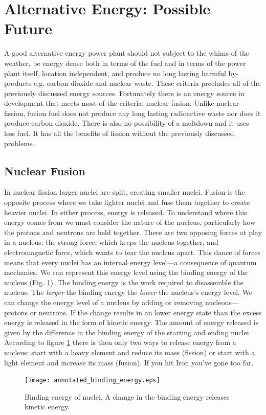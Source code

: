 \section{Alternative Energy: Possible Future}
A good alternative energy power plant should not subject to the whims of the weather, be energy dense both in terms of the fuel and in terms of the power plant itself, location independent, and produce no long lasting harmful by-products e.g. carbon dioxide and nuclear waste. These criteria precludes all of the previously discussed energy sources. Fortunately there is an energy source in development that meets most of the criteria: nuclear fusion. Unlike nuclear fission, fusion fuel does not produce any long lasting radioactive waste nor does it produce carbon dioxide. There is also no possibility of a meltdown and it uses less fuel. It has all the benefits of fission without the previously discussed problems.

\subsection{Nuclear Fusion}
In nuclear fission larger nuclei are split, creating smaller nuclei. Fusion is the opposite process where we take lighter nuclei and fuse them together to create heavier nuclei. In either process, energy is released. To understand where this energy comes from we must consider the nature of the nucleus, particularly how the protons and neutrons are held together. There are two opposing forces at play in a nucleus: the strong force, which keeps the nucleus together, and electromagnetic force, which wants to tear the nucleus apart. This dance of forces means that every nuclei has an internal energy level---a consequence of quantum mechanics.
We can represent this energy level using the binding energy of the nucleus (Fig. \ref{fig:binding_energy}). The binding energy is the work required to disassemble the nucleus. The \textit{larger} the binding energy the \textit{lower} the nucleus's energy level. We can change the energy level of a nucleus by adding or removing nucleons---protons or neutrons. If the change results in an lower energy state than the excess energy is released in the form of kinetic energy. The amount of energy released is given by the difference in the binding energy of the starting and ending nuclei. According to figure \ref{fig:binding_energy} there is then only two ways to release energy from a nucleus: start with a heavy element and reduce its mass (fission) or start with a light element and increase its mass (fusion). If you hit Iron you've gone too far.
\begin{figure}[h!]
    \centering
    \texttt{[image: annotated\_binding\_energy.eps]}
    \caption{Binding energy of nuclei. A change in the binding energy releases kinetic energy.}
    \label{fig:binding_energy}
\end{figure}

